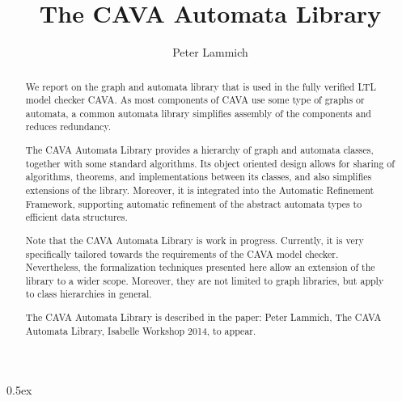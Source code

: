 \documentclass[11pt,a4paper]{article}
\begin{document}
\title{The CAVA Automata Library}
\author{Peter Lammich}
\maketitle

\begin{abstract}
  We report on the graph and automata library that is used in the fully verified LTL model checker CAVA.
  As most components of CAVA use some type of graphs or automata,
  a common automata library simplifies assembly of the components and reduces redundancy.

  The CAVA Automata Library provides a hierarchy of graph and automata classes, together with some standard algorithms.
  Its object oriented design allows for sharing of algorithms, theorems, and implementations between its classes,
  and also simplifies extensions of the library.
  Moreover, it is integrated into the Automatic Refinement Framework, supporting automatic refinement of the abstract automata types
  to efficient data structures.

  Note that the CAVA Automata Library is work in progress. Currently, it is very specifically tailored towards the requirements of the CAVA model checker.
  Nevertheless, the formalization techniques presented here allow an extension of the library to a wider scope. Moreover, they are not limited to graph libraries,
  but apply to class hierarchies in general.

  The CAVA Automata Library is described in the paper: Peter Lammich, The CAVA Automata Library, Isabelle Workshop 2014, to appear.
\end{abstract}

\clearpage

\tableofcontents

\clearpage

\parindent 0pt\parskip 0.5ex



\clearpage

% 
% 
\end{document}
